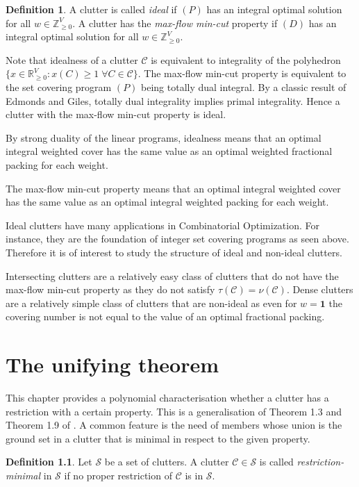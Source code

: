 \documentclass[a4paper, 12pt, twoside=false]{scrbook}
\theoremstyle{definition}
\newtheorem*{definition}{Definition}
\newcommand*{\IR}{\ensuremath{\mathbb{R}}}
\newcommand*{\IZ}{\ensuremath{\mathbb{Z}}}
\begin{document}
   \begin{definition}
       A clutter is called \emph{ideal} if $(P)$ has an integral optimal solution for all $w \in \IZ^V_{\geq 0}$. A clutter has the \emph{max-flow min-cut} property if $(D)$ has an integral optimal solution for all $w \in \IZ^V_{\geq 0}$.
   \end{definition}
   Note that idealness of a clutter $\mathcal{C}$ is equivalent to integrality of the polyhedron $\{x \in \IR^V_{\geq 0}: x(C) \geq 1 \; \forall C \in \mathcal{C}\}$.
   The max-flow min-cut property is equivalent to the set covering program $(P)$ being totally dual integral.
   By a classic result of Edmonds and Giles\cite{tdi}, totally dual integrality implies primal integrality.
   Hence a clutter with the max-flow min-cut property is ideal.

   By strong duality of the linear programs, idealness means that an optimal integral weighted cover has the same value as an optimal weighted fractional packing for each weight.

   The max-flow min-cut property means that an optimal integral weighted cover has the same value as an optimal integral weighted packing for each weight.

   Ideal clutters have many applications in Combinatorial Optimization. For instance, they are the foundation of integer set covering programs as seen above. Therefore it is of interest to study the structure of ideal and non-ideal clutters.

   Intersecting clutters are a relatively easy class of clutters that do not have the max-flow min-cut property as they do not satisfy $\tau(\mathcal{C})=\nu(\mathcal{C})$. Dense clutters are a relatively simple class of clutters that are non-ideal as even for $w=\textbf{1}$ the covering number is not equal to the value of an optimal fractional packing.

\chapter{The unifying theorem}
This chapter provides a polynomial characterisation whether a clutter has a restriction with a certain property.
This is a generalisation of Theorem 1.3 and Theorem 1.9 of \cite{restrictions}.
A common feature is the need of members whose union is the ground set in a clutter that is minimal in respect to the given property.
   \begin{definition}
       Let $\mathcal{S}$ be a set of clutters.
       A clutter $\mathcal{C} \in \mathcal{S}$ is called \emph{restriction-minimal} in $\mathcal{S}$ if no proper restriction of $\mathcal{C}$ is in $\mathcal{S}$.
   \end{definition}
\end{document}
